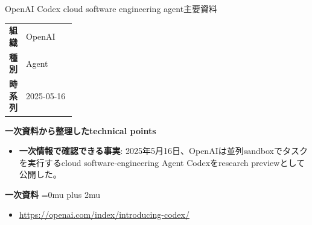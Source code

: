 \begin{technicalnote}{OpenAI Codex cloud software engineering agent}{主要資料}
\begingroup
\begin{tabularx}{\linewidth}{@{}>{\bfseries}p{0.22\linewidth}X@{}}
組織 & OpenAI \\
種別 & Agent \\
時系列 & 2025-05-16 \\
\end{tabularx}
\smallskip
\begin{minipage}{\linewidth}
{\bfseries 一次資料から整理したtechnical points}
\begin{itemize}[leftmargin=1.5em,itemsep=0.35em]
\item \textbf{一次情報で確認できる事実}: 2025年5月16日、OpenAIは並列sandboxでタスクを実行するcloud software-engineering Agent Codexをresearch previewとして公開した。
\end{itemize}
\begin{samepage}
{\bfseries 一次資料}
\begingroup\sloppy
\Urlmuskip=0mu plus 2mu\relax
\begin{itemize}[leftmargin=1.5em,itemsep=0.25em]
\item {\scriptsize\url{https://openai.com/index/introducing-codex/}}
\end{itemize}
\endgroup
\end{samepage}
\end{minipage}
\endgroup
\end{technicalnote}
\medskip

